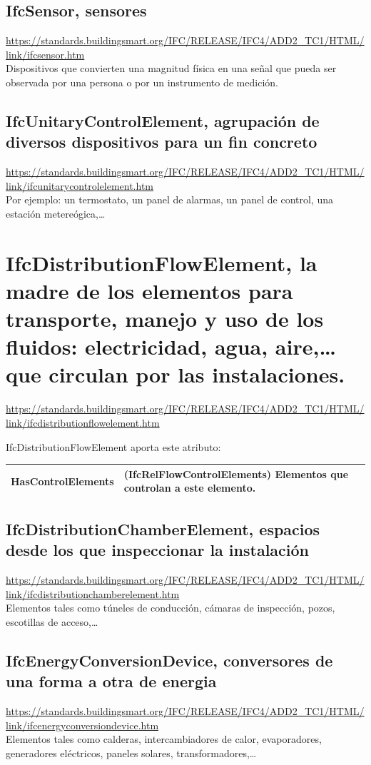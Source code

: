 \documentclass[spanish,12pt,a4paper,final,oneside]{book}
\begin{document}
\subsection{IfcSensor, sensores}
\url{https://standards.buildingsmart.org/IFC/RELEASE/IFC4/ADD2_TC1/HTML/link/ifcsensor.htm}
\\Dispositivos que convierten una magnitud física en una señal que pueda ser observada por una persona o por un instrumento de medición.

\subsection{IfcUnitaryControlElement, agrupación de diversos dispositivos para un fin concreto}
\url{https://standards.buildingsmart.org/IFC/RELEASE/IFC4/ADD2_TC1/HTML/link/ifcunitarycontrolelement.htm}
\\Por ejemplo: un termostato, un panel de alarmas, un panel de control, una estación metereógica,\ldots





\section{IfcDistributionFlowElement, la madre de los elementos para transporte, manejo y uso de los fluidos: electricidad, agua, aire,\ldots que circulan por las instalaciones.}
\url{https://standards.buildingsmart.org/IFC/RELEASE/IFC4/ADD2_TC1/HTML/link/ifcdistributionflowelement.htm}

IfcDistributionFlowElement aporta este atributo: 
\\ \begin{longtable}{|p{3cm} p{10cm}|}
\hline
HasControlElements & (IfcRelFlowControlElements) Elementos que controlan a este elemento.
\\[0.1cm] \hline
\end{longtable}


\subsection{IfcDistributionChamberElement, espacios desde los que inspeccionar la instalación}
\url{https://standards.buildingsmart.org/IFC/RELEASE/IFC4/ADD2_TC1/HTML/link/ifcdistributionchamberelement.htm}
\\Elementos tales como túneles de conducción, cámaras de inspección, pozos, escotillas de acceso,\ldots

\subsection{IfcEnergyConversionDevice, conversores de una forma a otra de energia}
\url{https://standards.buildingsmart.org/IFC/RELEASE/IFC4/ADD2_TC1/HTML/link/ifcenergyconversiondevice.htm}
\\Elementos tales como calderas, intercambiadores de calor, evaporadores, generadores eléctricos, paneles solares, transformadores,\ldots
\end{document}
